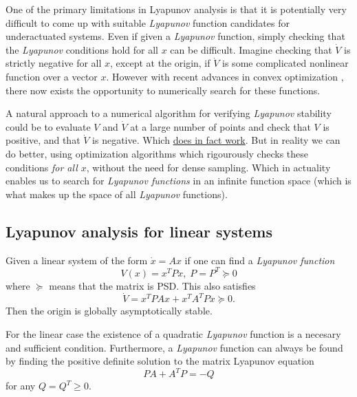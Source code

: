 One of the primary limitations in Lyapunov analysis is that it is potentially
very difficult to come up with suitable \textit{Lyapunov} function candidates
for underactuated systems. Even if given a \textit{Lyapunov} function, simply
checking that the \textit{Lyapunov} conditions hold for all \(x\) can be
difficult. Imagine checking that \(\dot{V}\) is strictly negative for all \(x\),
except at the origin, if \(\dot{V}\) is some complicated nonlinear function over
a vector \(x\). However with recent advances in convex optimization
\cite{parilloStructuredSemidefinitePrograms}, there now exists the opportunity
to numerically search for these functions.

A natural approach to a numerical algorithm for verifying \textit{Lyapunov}
stability could be to evaluate \(V\) and \(\dot{V}\) at a large number of points
and check that \(V\) is positive, and that \(\dot{V}\) is negative. Which
\href{https://github.com/RobotLocomotion/drake/blob/master/systems/analysis/test/lyapunov_test.cc}{does
  in fact work}. But in reality we can do better, using optimization algorithms
which rigourously checks these conditions \textit{for all \(x\)}, without the
need for dense sampling. Which in actuality enables us to search for
\textit{Lyapunov functions} in an infinite function space (which is what makes
up the space of all \textit{Lyapunov} functions).

\subsection{Lyapunov analysis for linear systems}
\label{subsec:Lyapunov analysis for linear systems}

\begin{theorem}
  Given a linear system of the form \(\dot{x} = Ax\) if one can find a
  \textit{Lyapunov function}
  \[
    V(x) = x^{T}Px, \; P = P^{T} \succeq 0
  \]
  where \(\succeq\) means that the matrix is \ac{PSD}.
  This also satisfies
  \[
    \dot{V} = x^{T}PAx + x^{T}A^{T}Px \succeq 0.
  \]
  Then the origin is globally asymptotically stable.
\end{theorem} \cite{tedrakeUnderactuatedRoboticsAlgorithms2019}

For the linear case the existence of a quadratic \textit{Lyapunov} function is a
necesary and sufficient condition. Furthermore, a \textit{Lyapunov} function can
always be found by finding the positive definite solution to the matrix Lyapunov
equation
\begin{equation}
  \label{eqn:linearlyapunov}
  PA + A^{T}P = -Q
\end{equation}
for any \(Q = Q^{T} \geqslant 0\).

